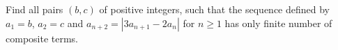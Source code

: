 Find all pairs $(b,c)$ of positive integers, such that the sequence defined by $a_1=b$, $a_2=c$ and $a_{n+2}= \left| 3a_{n+1}-2a_n \right|$ for $n \geq 1$ has only finite number of composite terms.

